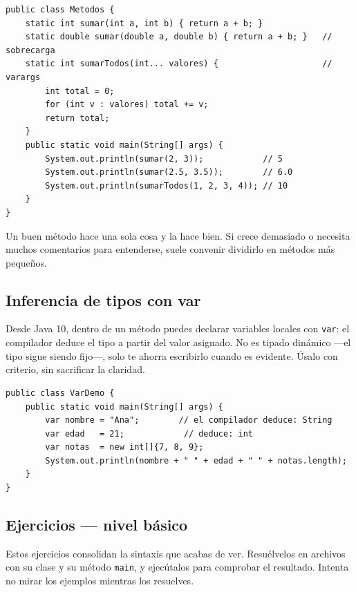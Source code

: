 \documentclass[11pt]{article}
\begin{document}
\begin{cajacodigo}
\begin{lstlisting}[style=java]
public class Metodos {
    static int sumar(int a, int b) { return a + b; }
    static double sumar(double a, double b) { return a + b; }   // sobrecarga
    static int sumarTodos(int... valores) {                     // varargs
        int total = 0;
        for (int v : valores) total += v;
        return total;
    }
    public static void main(String[] args) {
        System.out.println(sumar(2, 3));            // 5
        System.out.println(sumar(2.5, 3.5));        // 6.0
        System.out.println(sumarTodos(1, 2, 3, 4)); // 10
    }
}
\end{lstlisting}
\end{cajacodigo}
\vspace{2pt}
Un buen método hace una sola cosa y la hace bien. Si crece demasiado o necesita muchos comentarios para entenderse, suele convenir dividirlo en métodos más pequeños.

\subsection{Inferencia de tipos con var}
Desde Java 10, dentro de un método puedes declarar variables locales con \texttt{var}: el compilador deduce el tipo a partir del valor asignado. No es tipado dinámico —el tipo sigue siendo fijo—, solo te ahorra escribirlo cuando es evidente. Úsalo con criterio, sin sacrificar la claridad.

\begin{cajacodigo}
\begin{lstlisting}[style=java]
public class VarDemo {
    public static void main(String[] args) {
        var nombre = "Ana";        // el compilador deduce: String
        var edad   = 21;            // deduce: int
        var notas  = new int[]{7, 8, 9};
        System.out.println(nombre + " " + edad + " " + notas.length);
    }
}
\end{lstlisting}
\end{cajacodigo}
\vspace{2pt}
\subsection{Ejercicios — nivel básico}
Estos ejercicios consolidan la sintaxis que acabas de ver. Resuélvelos en archivos con su clase y su método \texttt{main}, y ejecútalos para comprobar el resultado. Intenta no mirar los ejemplos mientras los resuelves.
\end{document}
